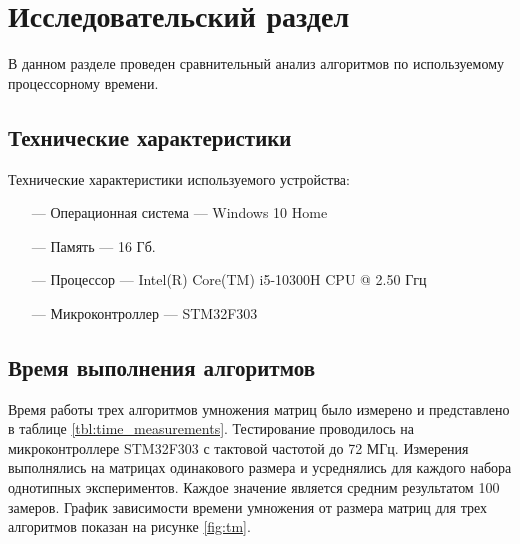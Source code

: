 \chapter{Исследовательский раздел}
В данном разделе проведен сравнительный анализ алгоритмов по используемому процессорному времени.

\section{Технические характеристики}
Технические характеристики используемого устройства:
\begin{itemize}
    \item[---] Операционная система --- Windows 10 Home \cite{Windows}
    \item[---] Память --- 16 Гб.
    \item[---] Процессор --- Intel(R) Core(TM) i5-10300H CPU @ 2.50 Ггц \cite{Intel}
    \item[---] Микроконтроллер --- STM32F303 \cite{STM}
\end{itemize}


\section{Время выполнения алгоритмов}
Время работы трех алгоритмов умножения матриц было измерено и представлено в таблице \ref{tbl:time_measurements}. Тестирование проводилось на микроконтроллере STM32F303 с тактовой частотой до 72 МГц. Измерения выполнялись на матрицах одинакового размера и усреднялись для каждого набора однотипных экспериментов. Каждое значение является средним результатом 100 замеров. График зависимости времени умножения от размера матриц для трех алгоритмов показан на рисунке \ref{fig:tm}.

